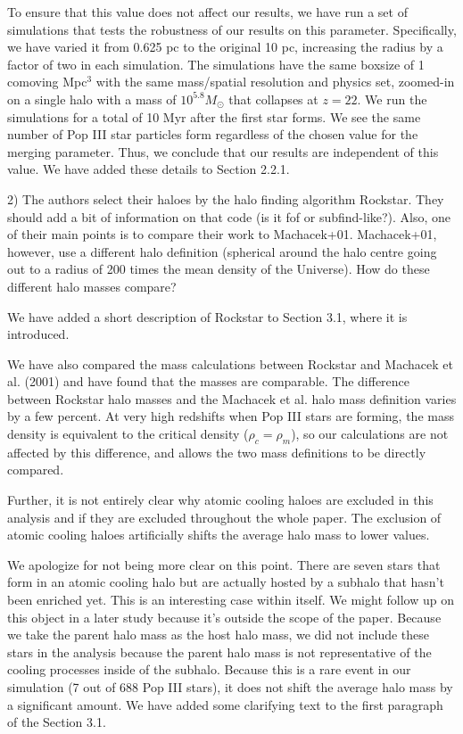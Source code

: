 \documentclass[11pt]{article}
\newenvironment{referee}[1][]{%
    \ignorespaces%
    \begin{mdframed}[style=myquotestyle,#1]%
}{%
    \end{mdframed}%
    \ignorespacesafterend%
}%
\begin{document}
To ensure that this value does not affect our results, we have run a set of simulations that tests the robustness of our results on this parameter.  Specifically, we have varied it from 0.625 pc to the original 10 pc, increasing the radius by a factor of two in each simulation. The simulations have the same boxsize of 1 comoving Mpc$^3$ with the same mass/spatial resolution and physics set, zoomed-in on a single halo with a mass of $10^{5.8} M_{\odot}$ that collapses at $z = 22$. We run the  simulations for a total of 10 Myr after the first star forms. We see the same number of Pop III star particles form regardless of the chosen value for the merging parameter. Thus, we conclude that our results are independent of this value. We have added these details to Section 2.2.1. 

\begin{referee}
2) The authors select their haloes by the halo finding algorithm Rockstar. They should add a bit of information on that code (is it fof or subfind-like?). Also, one of their main points is to compare their work to Machacek+01. Machacek+01, however, use a different halo definition (spherical around the halo centre going out to a radius of 200 times the mean density of the Universe). How do these different halo masses compare?
\end{referee}
We have added a short description of Rockstar to Section 3.1, where it is introduced.

We have also compared the mass calculations between Rockstar and Machacek et al. (2001) and have found that the masses are comparable. The difference between Rockstar halo masses and the Machacek et al. halo mass definition varies by a few percent. At very high redshifts when Pop III stars are forming, the mass density is equivalent to the critical density ($\rho_c = \rho_m$), so our calculations are not affected by this difference, and allows the two mass definitions to be directly compared. 

\begin{referee}
Further, it is not entirely clear why atomic cooling haloes are excluded in this analysis and if they are excluded throughout the whole paper. The exclusion of atomic cooling haloes artificially shifts the average halo mass to lower values.
\end{referee}
We apologize for not being more clear on this point.  There are seven stars that form in an atomic cooling halo but are actually hosted by a subhalo that hasn't been enriched yet. This is an interesting case within itself.  We might follow up on this object in a later study because it's outside the scope of the paper.  Because we take the parent halo mass as the host halo mass, we did not include these stars in the analysis because the parent halo mass is not representative of the cooling processes inside of the subhalo.  Because this is a rare event in our simulation (7 out of 688 Pop III stars), it does not shift the average halo mass by a significant amount.  We have added some clarifying text to the first paragraph of the Section 3.1.
\end{document}
